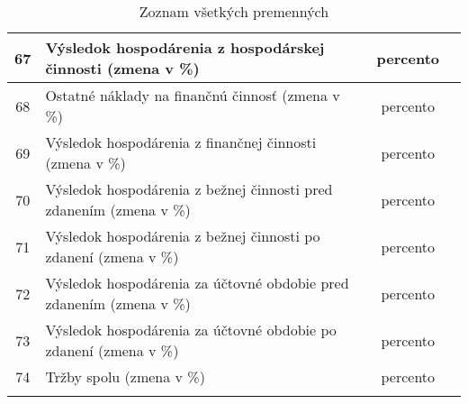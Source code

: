 \begin{longtable}{ |c|p{7cm}|c|p{2.4cm}| }
        \hline
        67 & Výsledok hospodárenia z hospodárskej činnosti (zmena v \%) & percento &  \\
        \hline
        68 & Ostatné náklady na finančnú činnosť (zmena v \%) & percento &  \\
        \hline
        69 & Výsledok hospodárenia z finančnej činnosti (zmena v \%) & percento &  \\
        \hline
        70 & Výsledok hospodárenia z bežnej činnosti pred zdanením (zmena v \%) & percento &  \\
        \hline
        71 & Výsledok hospodárenia z bežnej činnosti po zdanení (zmena v \%) & percento &  \\
        \hline
        72 & Výsledok hospodárenia za účtovné obdobie pred zdanením (zmena v \%) & percento &  \\
        \hline
        73 & Výsledok hospodárenia za účtovné obdobie po zdanení (zmena v \%) & percento &  \\
        \hline
        74 & Tržby spolu (zmena v \%) & percento &  \\
        \hline
    \caption{Zoznam všetkých premenných}
    \label{zoznam vsetkych premennych}
\end{longtable}